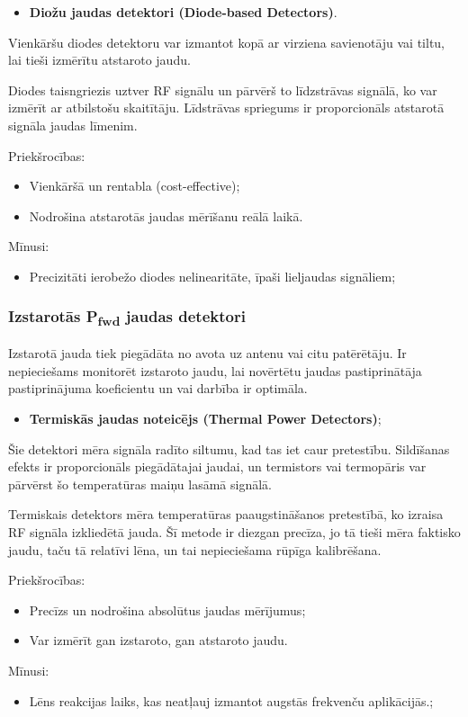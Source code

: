 \begin{itemize}
    \item \textbf{Diožu jaudas detektori (Diode-based Detectors)}.
\end{itemize}
Vienkāršu diodes detektoru var izmantot kopā ar virziena savienotāju vai tiltu, lai tieši izmērītu atstaroto jaudu.

Diodes taisngriezis uztver RF signālu un pārvērš to līdzstrāvas signālā, ko var izmērīt ar atbilstošu skaitītāju. Līdstrāvas spriegums ir proporcionāls atstarotā signāla jaudas līmenim.

Priekšrocības:
\begin{itemize}
    \item Vienkāršā un rentabla (cost-effective);
    \item Nodrošina atstarotās jaudas mērīšanu reālā laikā.
\end{itemize}
Mīnusi:
\begin{itemize}
    \item Precizitāti ierobežo diodes nelinearitāte, īpaši lieljaudas signāliem;
\end{itemize}

\subsubsection{Izstarotās P\textsubscript{fwd} jaudas detektori}
Izstarotā jauda tiek piegādāta no avota uz antenu vai citu patērētāju. Ir nepieciešams monitorēt izstaroto jaudu, lai novērtētu jaudas pastiprinātāja pastiprinājuma koeficientu un vai darbība ir optimāla.

\begin{itemize}
    \item \textbf{Termiskās jaudas noteicējs (Thermal Power Detectors)};
\end{itemize}
Šie detektori mēra signāla radīto siltumu, kad tas iet caur pretestību. Sildīšanas efekts ir proporcionāls piegādātajai jaudai, un termistors vai termopāris var pārvērst šo temperatūras maiņu lasāmā signālā.

Termiskais detektors mēra temperatūras paaugstināšanos pretestībā, ko izraisa RF signāla izkliedētā jauda. Šī metode ir diezgan precīza, jo tā tieši mēra faktisko jaudu, taču tā relatīvi lēna, un tai nepieciešama rūpīga kalibrēšana.

Priekšrocības:
\begin{itemize}
    \item Precīzs un nodrošina absolūtus jaudas mērījumus;
    \item Var izmērīt gan  izstaroto, gan atstaroto jaudu.
\end{itemize}
Mīnusi:
\begin{itemize}
    \item Lēns reakcijas laiks, kas neatļauj izmantot augstās frekvenču aplikācijās.;
\end{itemize}

